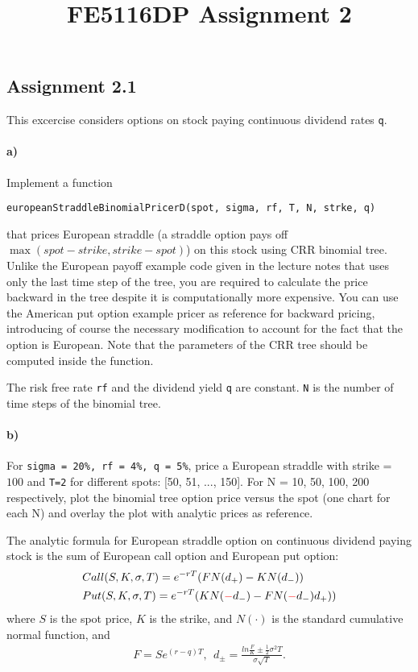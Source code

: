 \documentclass[11pt,a4paper,hidelinks,fleqn]{article}            %
\title{\vspace{-5ex}FE5116DP Assignment 2\vspace{-7ex}}
\date{}
\begin{document}
\maketitle
\subsection*{Assignment 2.1}
This excercise considers options on stock paying continuous dividend rates \verb=q=. 
\vspace{-1cm}
\paragraph{a)} Implement a function 
\vspace{-5mm}
\begin{verbatim}
europeanStraddleBinomialPricerD(spot, sigma, rf, T, N, strke, q)
\end{verbatim}
\vspace{-5mm}
that prices European straddle (a straddle option pays off $\max(spot-strike, strike-spot)$) on this stock using CRR binomial tree.
Unlike the European payoff example code given in the lecture notes that uses only the last time step of the tree, 
you are required to calculate the price backward in the tree despite it is computationally more expensive. 
You can use the American put option example pricer as reference for backward pricing, introducing of course the necessary modification to account for the fact that the option is European.  
Note that the parameters of the CRR tree should be computed inside the function.

The risk free rate \verb=rf= and the dividend yield \verb=q= are constant.
\verb=N= is the number of time steps of the binomial tree.

\paragraph{b)} For \verb_sigma = 20%, rf = 4%, q = 5%_, 
price a European straddle with strike = $100$ and \verb_T=2_ for different spots: [50, 51, ..., 150].
For N = 10, 50, 100, 200 respectively, plot the binomial tree option price versus the spot (one chart for each N) and overlay the plot with analytic prices as reference.

The analytic formula for European straddle option on continuous dividend paying stock is the sum of European call option and European put option:
\begin{align*}
 & Call(S, K, \sigma, T) = e^{-rT} (F N(d_+) - K N(d_-)) \\
 & Put(S, K, \sigma, T) = e^{-rT} ( K N(\textbf{\textcolor{red}{$-$}}d_-) - F N(\textbf{\textcolor{red}{$-$}}d_-) d_+))
\end{align*}
where $S$ is the spot price, $K$ is the strike, and $N(\cdot)$ is the standard cumulative normal function, and
\begin{align*}
F = S e^{(r-q)T}, ~~
d_{\pm} = \frac{ln\frac{F}{K}  \pm \frac{1}{2}\sigma^2T}{\sigma\sqrt{T}}.
\end{align*}
\end{document}
